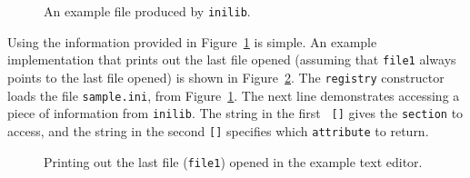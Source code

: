 \begin{figure}[!h]
\caption{An example file produced by {\tt inilib}.}
\label{fig:sample_file}
\end{figure}

Using the information provided in Figure~\ref{fig:sample_file} is
simple.  An example implementation that prints out the last file
opened (assuming that {\tt file1} always points to the last file
opened) is shown in Figure~\ref{fig:print_file}.  The {\tt registry}
constructor loads the file {\tt sample.ini}, from
Figure~\ref{fig:sample_file}.  The next line demonstrates accessing a
piece of information from {\tt inilib}.  The string in the first {\tt
  []} gives the {\tt section} to access, 
and the string in the second {\tt []} specifies which {\tt attribute}
to return.  

\begin{figure}[!h]
\caption{Printing out the last file ({\tt file1}) opened in the
example text editor.}
\label{fig:print_file}
\end{figure}
